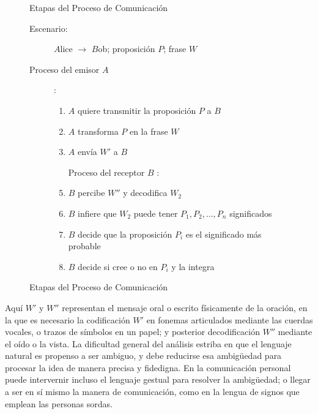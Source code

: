 \begin{figure}[htbp]
\centering
\begin{framed}
\begin{minipage}{\textwidth}
\begin{center}
{\large \textsf{Etapas del Proceso de Comunicación}}
\end{center}
\begin{description}
\item[Escenario:] $A$lice $\longrightarrow$ $B$ob; proposición $P$; frase $W$
\item[Proceso del emisor $A$]:
\begin{enumerate}
\item {} $A$ quiere transmitir la proposición $P$ a $B$
\item {} $A$ transforma $P$ en la frase $W$
\item {} $A$ envía $W'$ a $B$
\item[Proceso del receptor $B$]:
\item {} $B$ percibe $W''$ y decodifica $W_2$
\item {} $B$ infiere que $W_2$ puede tener $P_1, P_2, \ldots, P_n$ significados
\item {} $B$ decide que la proposición $P_i$ es el significado más probable
\item {} $B$ decide si cree o no en $P_i$ y la integra
\end{enumerate}
\end{description}
\end{minipage}
\end{framed}
\caption[Etapas del Proceso de Comunicación]{Etapas del Proceso de Comunicación \citep[pp. 792]{Russell2003}}
\label{fig:steps-comm-process}
\end{figure}

Aquí $W'$ y $W''$ representan el mensaje oral o escrito físicamente de la oración, en la que es necesario la codificación $W'$ en fonemas articulados mediante las cuerdas vocales, o trazos de símbolos en un papel; y posterior decodificación $W''$ mediante el oído o la vista. La dificultad general del análisis estriba en que el lenguaje natural es propenso a ser ambiguo, y debe reducirse esa ambigüedad para procesar la idea de manera precisa y fidedigna. En la comunicación personal puede intervernir incluso el lenguaje gestual para resolver la ambigüedad; o llegar a ser en sí mismo la manera de comunicación, como en la lengua de signos que emplean las personas sordas.


